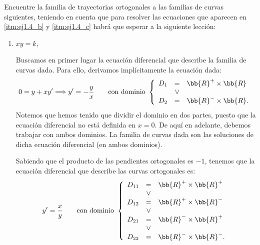 \begin{ejercicio}
    Encuentre la familia de trayectorias ortogonales a las familias de curvas siguientes, teniendo en cuenta que para resolver las ecuaciones que aparecen en \ref{itm:ej1.4_b} y \ref{itm:ej1.4_c} habrá que esperar a la siguiente lección:
    \begin{enumerate}
        \item \(xy = k\),
        
        Buscamos en primer lugar la ecuación diferencial que describe la familia de curvas dada. Para ello, derivamos implícitamente la ecuación dada:
        \begin{equation*}
            0 = y + xy' \Longrightarrow y' = -\dfrac{y}{x}\qquad \text{con dominio } \left\{\begin{array}{rcl}
                D_1&=&\bb{R}^+\times \bb{R}\\
                &\lor& \\
                D_2&=&\bb{R}^-\times \bb{R}.\\
            \end{array}\right.
        \end{equation*}
        Notemos que hemos tenido que dividir el dominio en dos partes, puesto que la ecuación diferencial no está definida en $x=0$.
        De aquí en adelante, debemos trabajar con ambos dominios. La familia de curvas dada son las soluciones de dicha ecuación diferencial (en ambos dominios).

        Sabiendo que el producto de las pendientes ortogonales es $-1$, tenemos que la ecuación diferencial que describe las curvas ortogonales es:
        \begin{equation*}
            y' = \dfrac{x}{y} \qquad \text{con dominio } \left\{\begin{array}{rcl}
                D_{11}&=&\bb{R}^+\times \bb{R}^+\\
                &\lor& \\
                D_{12}&=&\bb{R}^+\times \bb{R}^-\\
                &\lor& \\
                D_{21}&=&\bb{R}^-\times \bb{R}^+\\
                &\lor& \\
                D_{22}&=&\bb{R}^-\times \bb{R}^-.
            \end{array}\right.
        \end{equation*}

        

\end{enumerate}
\end{ejercicio}
